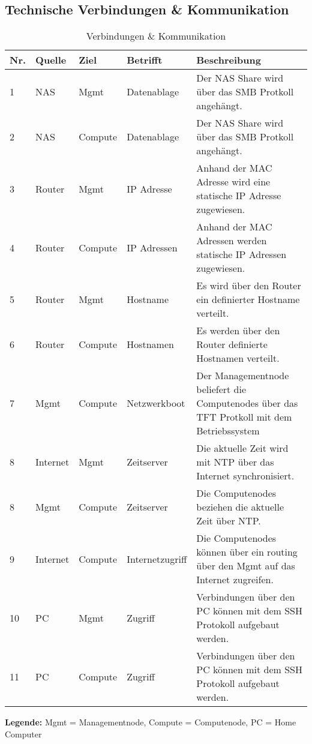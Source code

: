 \subsection{Technische Verbindungen \& Kommunikation}
\begin{table}[H]
\centering
\begin{tabular}{p{1cm}p{1.5cm}p{1.5cm}p{2.2cm}p{8.8cm}}
\hline
\rowcolor{heading} \textbf{Nr.} & \textbf{Quelle} & \textbf{Ziel }& \textbf{Betrifft} & \textbf{Beschreibung} \\\hline
1 & NAS & Mgmt & Datenablage & Der NAS Share wird über das SMB Protkoll angehängt. \\\hline
2 & NAS & Compute & Datenablage & Der NAS Share wird über das SMB Protkoll angehängt. \\\hline
3 & Router & Mgmt & IP Adresse & Anhand der MAC Adresse wird eine statische IP Adresse zugewiesen. \\\hline
4 & Router & Compute & IP Adressen & Anhand der MAC Adressen werden statische IP Adressen zugewiesen. \\\hline
5 & Router & Mgmt &Hostname & Es wird über den Router ein definierter Hostname verteilt. \\\hline
6 & Router & Compute & Hostnamen & Es werden über den Router definierte Hostnamen verteilt. \\\hline
7 & Mgmt & Compute & Netzwerkboot & Der Managementnode beliefert die Computenodes über das TFT Protkoll mit dem Betriebssystem \\\hline
8 & Internet & Mgmt & Zeitserver & Die aktuelle Zeit wird mit NTP über das Internet synchronisiert.\\\hline
8 & Mgmt & Compute & Zeitserver & Die Computenodes beziehen die aktuelle Zeit über NTP.\\\hline
9 & Internet & Compute & Internetzugriff & Die Computenodes können über ein routing über den Mgmt auf das Internet zugreifen. \\\hline
10 & PC & Mgmt & Zugriff & Verbindungen über den PC können mit dem SSH Protokoll aufgebaut werden. \\\hline
11 & PC & Compute & Zugriff & Verbindungen über den PC können mit dem SSH Protokoll aufgebaut werden. \\\hline
\end{tabular}
\caption{Verbindungen \& Kommunikation}
\end{table}
\textbf{Legende:} Mgmt = Managementnode, Compute = Computenode, PC = Home Computer
